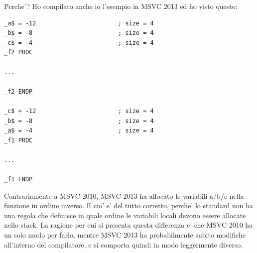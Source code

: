 Perche'?
Ho compilato anche io l'esempio in MSVC 2013 ed ho visto questo:


\begin{lstlisting}[caption=MSVC 2013]
_a$ = -12						; size = 4
_b$ = -8						; size = 4
_c$ = -4						; size = 4
_f2	PROC

...

_f2	ENDP

_c$ = -12						; size = 4
_b$ = -8						; size = 4
_a$ = -4						; size = 4
_f1	PROC

...

_f1	ENDP
\end{lstlisting}

Contrariamente a MSVC 2010, MSVC 2013 ha allocato le variabili a/b/c nella funzione  in ordine inverso.%
E cio' e' del tutto corretto, perche' lo standard \CCpp non ha una regola che definisce in quale ordine le variabili locali devono essere allocate nello stack.
La ragione per cui si presenta questa differenza e' che MSVC 2010 ha un solo modo per farlo, mentre MSVC 2013 ha probabilmente subito modifiche all'interno del compilatore, e si comporta quindi in modo leggermente diverso. 
